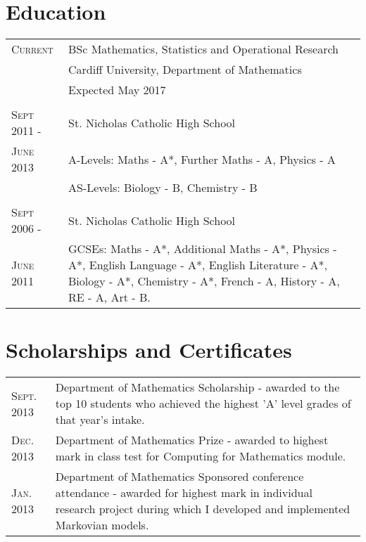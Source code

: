 \documentclass[a4paper]{article}
\begin{document}
\section{Education}
\begin{tabularx}{\textwidth}{lX}

\textsc{Current} & \textsc BSc Mathematics, Statistics and Operational Research \\
&\normalsize Cardiff University, Department of Mathematics\\
& Expected May 2017\\
\\
\textsc{Sept 2011 -} & St. Nicholas Catholic High School\\
\textsc{June 2013} & A-Levels: Maths - A*, Further Maths - A, Physics - A\\
& AS-Levels: Biology - B, Chemistry - B\\
\\
\textsc{Sept 2006 -} & St. Nicholas Catholic High School\\
\textsc{June 2011} & GCSEs: Maths - A*, Additional Maths - A*, Physics - A*, English Language - A*, English Literature - A*, Biology - A*, Chemistry - A*, French - A, History - A, RE - A, Art - B.\\

\end{tabularx}
\section{Scholarships and Certificates}
\begin{tabularx}{\textwidth}{lX}

\textsc{Sept.} 2013 & Department of Mathematics Scholarship - awarded to the top 10 students who achieved the highest 'A' level grades of that year's intake.\\
\textsc{Dec.} 2013 & Department of Mathematics Prize - awarded to highest mark in class test for Computing for Mathematics module.\\
\textsc{Jan.} 2013 & Department of Mathematics Sponsored conference attendance - awarded for highest mark in individual research project during which I developed and implemented Markovian models.\\

\end{tabularx}
\end{document}
